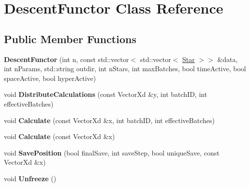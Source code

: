 \hypertarget{classDescentFunctor}{}\section{Descent\+Functor Class Reference}
\label{classDescentFunctor}
\subsection*{Public Member Functions}
\begin{DoxyCompactItemize}
\item 
\mbox{\label{classDescentFunctor_a8d72ed3391cb867e5568ca2cc1b4c325}} 
{\bfseries Descent\+Functor} (int n, const std\+::vector$<$ std\+::vector$<$ \hyperlink{classStar}{Star} $>$$>$ \&data, int n\+Params, std\+::string outdir, int n\+Stars, int max\+Batches, bool time\+Active, bool space\+Active, bool hyper\+Active)
\item 
\mbox{\label{classDescentFunctor_a38f1c319b730f318c9ce89718e377ebf}} 
void {\bfseries Distribute\+Calculations} (const Vector\+Xd \&y, int batch\+ID, int effective\+Batches)
\item 
\mbox{\label{classDescentFunctor_a0c3a1b76e6fce3713c6d6a8761ff1bf3}} 
void {\bfseries Calculate} (const Vector\+Xd \&x, int batch\+ID, int effective\+Batches)
\item 
\mbox{\label{classDescentFunctor_acfae2cdc2983a8eb215fb334bcdb0863}} 
void {\bfseries Calculate} (const Vector\+Xd \&x)
\item 
\mbox{\label{classDescentFunctor_a3de250a0703477a82312614785bcdb8b}} 
void {\bfseries Save\+Position} (bool final\+Save, int save\+Step, bool unique\+Save, const Vector\+Xd \&x)
\item 
\mbox{\label{classDescentFunctor_a516e1d332b2ce3d3307e2ee67ee0b94f}} 
void {\bfseries Unfreeze} ()
\end{DoxyCompactItemize}
